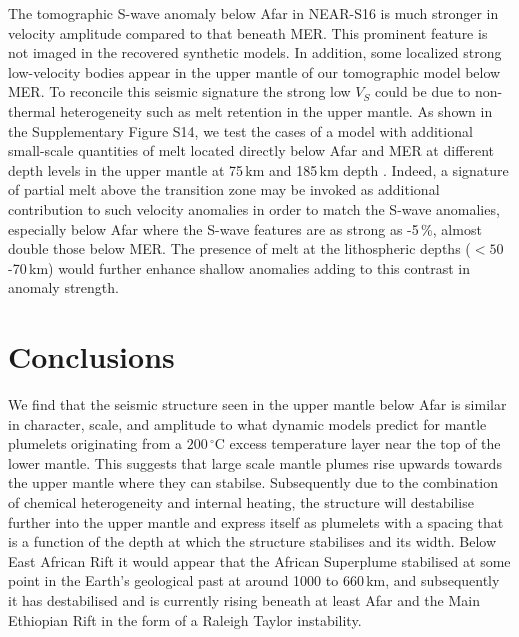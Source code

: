 \documentclass[a4paper,10pt,twocolumn]{paper}
\begin{document}
The tomographic S-wave anomaly below Afar in NEAR-S16 is much stronger in velocity amplitude compared to that beneath MER. This prominent feature is not imaged in the recovered synthetic models. In addition, some localized strong low-velocity bodies appear in the upper mantle of our tomographic model below MER. To reconcile this seismic signature the strong low $V_{S}$ could be due to non-thermal heterogeneity such as melt retention in the upper mantle. As shown in the Supplementary Figure S14, we test the cases of a model with additional small-scale quantities of melt located directly below Afar and MER at different depth levels in the upper mantle at 75\,km and 185\,km depth \citep[c.f.][]{thompson-etal-2015}. Indeed, a signature of partial melt above the transition zone may be invoked as additional contribution to such velocity anomalies in order to match the S-wave anomalies, especially below Afar where the S-wave features are as strong as -5\,\%, almost double those below MER. The presence of melt at the lithospheric depths ($<50$-70\,km) would further enhance shallow anomalies adding to this contrast in anomaly strength. 

\section{Conclusions}

We find that the seismic structure seen in the upper mantle below Afar is similar in character, scale, and amplitude to what dynamic models predict for mantle plumelets originating from a $200\,^{\circ}$C excess temperature layer near the top of the lower mantle. This suggests that large scale mantle plumes rise upwards towards the upper mantle where they can stabilse. Subsequently due to the combination of chemical heterogeneity and internal heating, the structure will destabilise further into the upper mantle and express itself as plumelets with a spacing that is a function of the depth at which the structure stabilises and its width. Below East African Rift it would appear that the African Superplume stabilised at some point in the Earth's geological past at around 1000 to 660\,km, and subsequently it has destabilised and is currently rising beneath at least Afar and the Main Ethiopian Rift in the form of a Raleigh Taylor instability.
\end{document}
